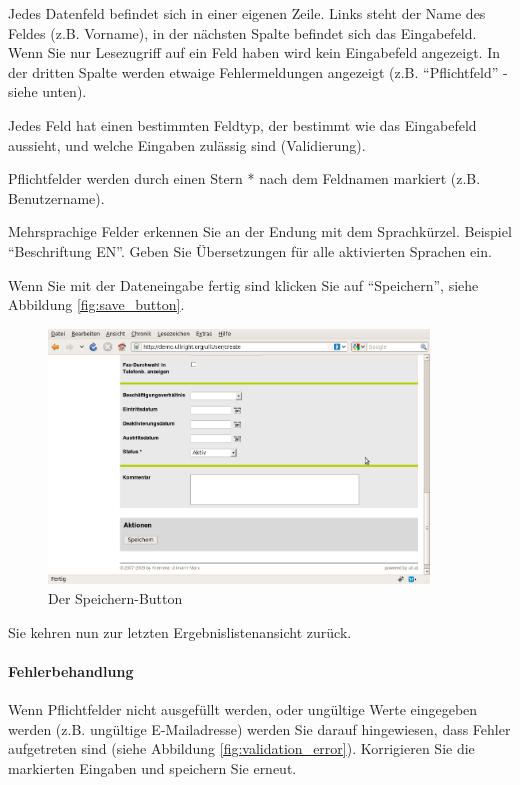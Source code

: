 \documentclass[article, a4paper, oneside, 11pt]{memoir}
\begin{document}
Jedes Datenfeld befindet sich in einer eigenen Zeile. Links steht der Name des Feldes (z.B. Vorname), in der nächsten Spalte befindet sich das Eingabefeld. Wenn Sie nur Lesezugriff auf ein Feld haben wird kein Eingabefeld angezeigt. In der dritten Spalte werden etwaige Fehlermeldungen angezeigt (z.B. "`Pflichtfeld"' - siehe unten). 

Jedes Feld hat einen bestimmten Feldtyp, der bestimmt wie das Eingabefeld aussieht, und welche Eingaben  zulässig sind (Validierung). 

Pflichtfelder werden durch einen Stern * nach dem Feldnamen markiert (z.B. Benutzername).

Mehrsprachige Felder erkennen Sie an der Endung mit dem Sprachkürzel. Beispiel "`Beschriftung EN"'. Geben Sie Übersetzungen für alle aktivierten Sprachen ein.

Wenn Sie mit der Dateneingabe fertig sind klicken Sie auf "`Speichern"', siehe Abbildung \vref{fig:save_button}.

\begin{figure}[htp]
\centering
\includegraphics[trim=0 0 0 300pt,clip,width=0.9\textwidth]{figures/ullrightgermanexport-img11.png}
\caption{Der Speichern-Button}
\label{fig:save_button}
\end{figure}

Sie kehren nun zur letzten Ergebnislistenansicht zurück. 

\paragraph{Fehlerbehandlung}

Wenn Pflichtfelder nicht ausgefüllt werden, oder ungültige Werte eingegeben werden (z.B. ungültige E-Mailadresse) werden Sie darauf hingewiesen, dass Fehler aufgetreten sind (siehe Abbildung \vref{fig:validation_error}). Korrigieren Sie die markierten Eingaben und speichern Sie erneut.
\end{document}
